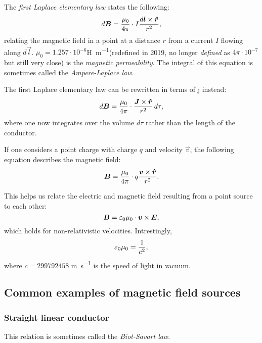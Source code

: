     The \textit{first Laplace elementary law} states the following:
    \begin{equation}
        d\B = \frac{\mu_0}{4\pi}\cdot I\frac{d\vec{l}\times\hat{r}}{r^2},
    \end{equation}
    relating the magnetic field in a point at a distance $r$ from a current $I$ flowing along $d\vec{l}$.
    $\mu_0 = 1.257\cdot 10^{-6}$\si{\henry\per\metre}(redefined in 2019, 
    no longer \textit{defined} as $4\pi\cdot10^{-7}$ but still very close) is the \textit{magnetic permeability}. 
    The integral of this equation is sometimes called the \textit{Ampere-Laplace law}.

    The first Laplace elementary law can be rewritten in terms of \j{} instead:
    \begin{equation}
        d\B = \frac{\mu_0}{4\pi}\cdot \frac{\j\times\hat{r}}{r^2}\,d\tau,
    \end{equation}
    where one now integrates over the volume $d\tau$ rather than the length of the conductor.

    If one considers a point charge with charge $q$ and velocity $\vec{v}$, 
    the following equation describes the magnetic field:
    \begin{equation}
        \B = \frac{\mu_0}{4\pi}\cdot q\frac{\vec{v}\times\hat{r}}{r^2}.
    \end{equation}

    This helps us relate the electric and magnetic field resulting from a point source to each other:
    \begin{equation}
        \bm{B} = \varepsilon_0 \mu_0 \cdot\bm{v}\times\bm{E},
    \end{equation}
    which holds for non-relativistic velocities. Intrestingly,
    \begin{equation}
        \varepsilon_0\mu_0 = \frac{1}{c^2},
    \end{equation}
    where $c = 299792458$ \si{\metre\per\second} is the speed of light in vacuum. 

\subsection{Common examples of magnetic field sources}
    \subsubsection*{Straight linear conductor}
        This relation is sometimes called the \textit{Biot-Savart law}.

